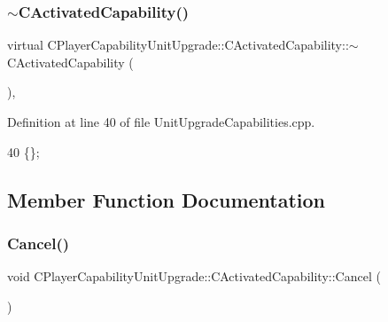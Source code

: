 \hypertarget{classCPlayerCapabilityUnitUpgrade_1_1CActivatedCapability_a4402be13dd341fdc5a2612732c6d2b39}{}\label{classCPlayerCapabilityUnitUpgrade_1_1CActivatedCapability_a4402be13dd341fdc5a2612732c6d2b39} 
\subsubsection{\texorpdfstring{$\sim$\+C\+Activated\+Capability()}{~CActivatedCapability()}}
{\footnotesize\ttfamily virtual C\+Player\+Capability\+Unit\+Upgrade\+::\+C\+Activated\+Capability\+::$\sim$\+C\+Activated\+Capability (\begin{DoxyParamCaption}{ }\end{DoxyParamCaption})\hspace{0.3cm}{\ttfamily [inline]}, {\ttfamily [virtual]}}



Definition at line 40 of file Unit\+Upgrade\+Capabilities.\+cpp.


\begin{DoxyCode}
40 \{\};
\end{DoxyCode}


\subsection{Member Function Documentation}
\hypertarget{classCPlayerCapabilityUnitUpgrade_1_1CActivatedCapability_a29b41666081cf420e9f3b7d93c09920b}{}\label{classCPlayerCapabilityUnitUpgrade_1_1CActivatedCapability_a29b41666081cf420e9f3b7d93c09920b} 
\subsubsection{\texorpdfstring{Cancel()}{Cancel()}}
{\footnotesize\ttfamily void C\+Player\+Capability\+Unit\+Upgrade\+::\+C\+Activated\+Capability\+::\+Cancel (\begin{DoxyParamCaption}{ }\end{DoxyParamCaption})\hspace{0.3cm}{\ttfamily [virtual]}}



